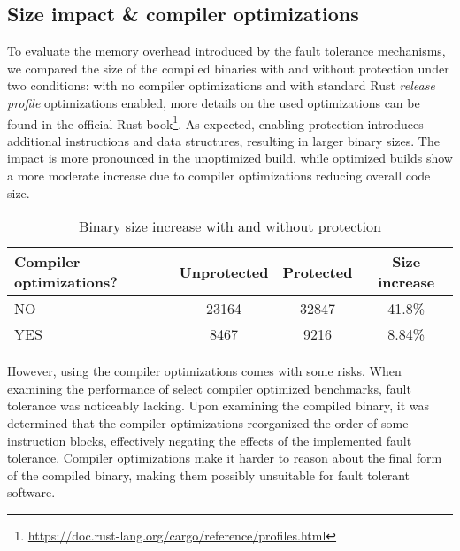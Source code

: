 
\subsection{Size impact \& compiler optimizations}

To evaluate the memory overhead introduced by the fault tolerance mechanisms, we compared the size of the compiled binaries with and without protection under two conditions: with no compiler optimizations and with standard Rust \textit{release profile} optimizations enabled, more details on the used optimizations can be found in the official Rust book\footnote{\url{https://doc.rust-lang.org/cargo/reference/profiles.html}}. As expected, enabling protection introduces additional instructions and data structures, resulting in larger binary sizes. The impact is more pronounced in the unoptimized build, while optimized builds show a more moderate increase due to compiler optimizations reducing overall code size.

\begin{table}[!h]
\centering
\begin{tabular}{|l|c|c|c|}
\hline
\textbf{Compiler optimizations?} & \textbf{Unprotected} & \textbf{Protected} & \textbf{Size increase} \\
\hline
NO  & 23164 & 32847 & 41.8\% \\
YES & 8467 & 9216 & 8.84\% \\
\hline
\end{tabular}
\caption{Binary size increase with and without protection}
\end{table}

However, using the compiler optimizations comes with some risks. When examining the performance of select compiler optimized benchmarks, fault tolerance was noticeably lacking. Upon examining the compiled binary, it was determined that the compiler optimizations reorganized the order of some instruction blocks, effectively negating the effects of the implemented fault tolerance. Compiler optimizations make it harder to reason about the final form of the compiled binary, making them possibly unsuitable for fault tolerant software.
